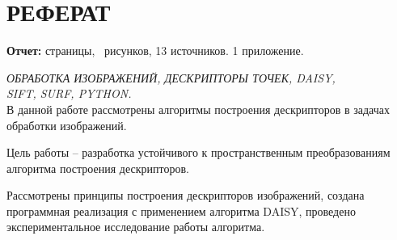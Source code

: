 
\def\l@subsection{\@dottedtocline{2}{3.8em}{3.2em}}
\setcounter{tocdepth}{2}



\newcommand{\incpic}[3]{
	\begin{figure}[H] 
		\begin{center} 
			\texttt{[image: \#1]} 
			\caption{#2}
			\label{#3} 
		\end{center}
	\end{figure} 
}




\setcounter{page}{3}
\setcounter{secnumdepth}{3}

\section*{РЕФЕРАТ}
{
	{\bf Отчет:}
	\pageref{LastPage} страницы,
	\totalfigures\ рисунков,
	13 источников.
	1 приложение.
	
	
	\textit{ОБРАБОТКА ИЗОБРАЖЕНИЙ, ДЕСКРИПТОРЫ ТОЧЕК, DAISY, \\SIFT, SURF, PYTHON.}\\
	
	В данной работе рассмотрены алгоритмы построения дескрипторов в задачах обработки изображений.
	
	Цель работы -- разработка устойчивого к пространственным преобразованиям алгоритма построения дескрипторов.
	
	Рассмотрены принципы построения дескрипторов изображений, создана программная реализация с применением алгоритма DAISY, проведено экспериментальное исследование работы алгоритма.
}
\newpage

\newpage
\tableofcontents


